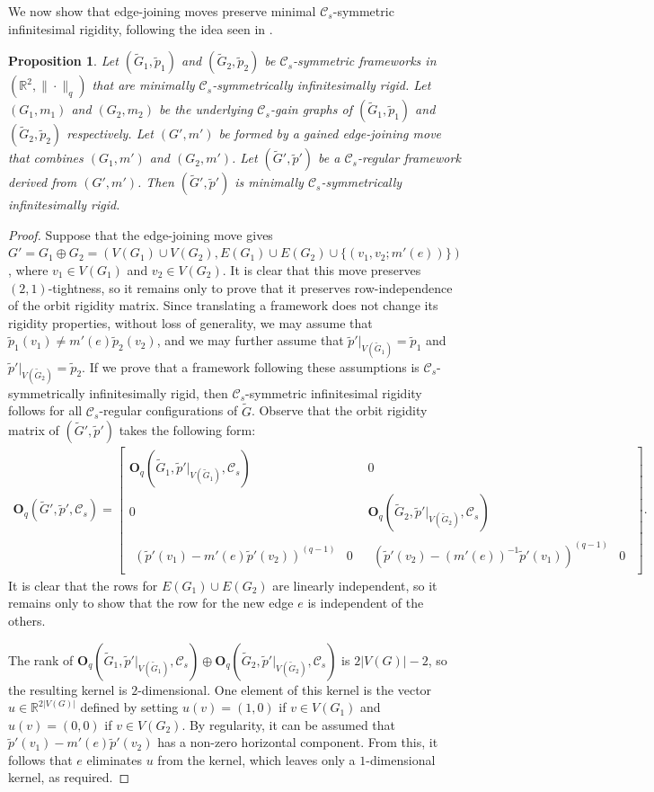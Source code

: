 \documentclass[reqno,a4paper,10pt]{article}
\newtheorem{proposition}[theorem]{Proposition}
\theoremstyle{definition}
\theoremstyle{remark}
\numberwithin{equation}{section}
\numberwithin{figure}{section}
\numberwithin{table}{section}
\newcommand{\R}{\mathbb{R}}
\newcommand{\G}{\tilde{G}}
\newcommand{\p}{\tilde{p}}
\begin{document}
    We now show that edge-joining moves preserve minimal $\mathcal{C}_s$-symmetric infinitesimal rigidity, following the idea seen in \cite[Lemma 11]{Surfaces}.
    \begin{proposition}\label{LqCsJoiningExtension}
		Let $(\G_1,\p_1)$ and $(\G_2,\p_2)$ be $\mathcal{C}_s$-symmetric frameworks in $(\R^2,\|\cdot\|_q)$ that are minimally $\mathcal{C}_s$-symmetrically infinitesimally rigid. Let $(G_1,m_1)$ and $(G_2,m_2)$ be the underlying $\mathcal{C}_s$-gain graphs of $(\G_1,\p_1)$ and $(\G_2,\p_2)$ respectively. Let $(G',m')$ be formed by a gained edge-joining move that combines $(G_1,m')$ and $(G_2,m')$. Let $(\G',\p')$ be a $\mathcal{C}_s$-regular framework derived from $(G',m')$. Then $(\G',\p')$ is minimally $\mathcal{C}_s$-symmetrically infinitesimally rigid.
	\end{proposition}
	\begin{proof}
		Suppose that the edge-joining move gives $G'= G_1\oplus G_2=(V(G_1)\cup V(G_2),E(G_1)\cup E(G_2)\cup\{(v_1,v_2;m'(e))\})$, where $v_1\in V(G_1)$ and $v_2\in V(G_2)$. It is clear that this move preserves $(2,1)$-tightness, so it remains only to prove that it preserves row-independence of the orbit rigidity matrix. Since translating a framework does not change its rigidity properties, without loss of generality, we may assume that $\tilde{p}_1(v_1)\neq m'(e)\tilde{p}_2(v_2)$, and  we may further assume that $\p'|_{V(\G_1)}=\p_1$ and $\p'|_{V(\G_2)}=\p_2$. If we prove that a framework following these assumptions is $\mathcal{C}_s$-symmetrically infinitesimally rigid, then $\mathcal{C}_s$-symmetric infinitesimal rigidity follows for all $\mathcal{C}_s$-regular configurations of $\G$. Observe that the orbit rigidity matrix of $(\G',\p')$ takes the following form:
		\begin{align*}
			\mathbf{O}_q(\G',\p',\mathcal{C}_s)=
			\begin{bmatrix}
				\mathbf{O}_q(\G_1,\p'|_{V(\G_1)},\mathcal{C}_s)&0\\
				0&\mathbf{O}_q(\G_2,\p'|_{V(\G_2)},\mathcal{C}_s)\\
				\begin{matrix}
					(\p'(v_1)-m'(e)\p'(v_2))^{(q-1)}&0
				\end{matrix}
				&
				\begin{matrix}
					(\p'(v_2)-(m'(e))^{-1}\p'(v_1))^{(q-1)}&0
				\end{matrix}
			\end{bmatrix}
			.
		\end{align*}
		It is clear that the rows for $E(G_1)\cup E(G_2)$ are linearly independent, so it remains only to show that the row for the new edge $e$ is independent of the others.

        The rank of $\mathbf{O}_q(\G_1,\p'|_{V(\G_1)},\mathcal{C}_s)\oplus\mathbf{O}_q(\G_2,\p'|_{V(\G_2)},\mathcal{C}_s)$ is $2|V(G)|-2$, so the resulting kernel is $2$-dimensional. One element of this kernel is the vector $u\in \R^{2|V(G)|}$ defined by setting $u(v)=(1,0)$ if $v\in V(G_1)$ and $u(v)=(0,0)$ if $v\in V(G_2)$. By regularity, it can be assumed that $\p'(v_1)-m'(e)\p'(v_2)$ has a non-zero horizontal component. From this, it follows that $e$ eliminates $u$ from the kernel, which leaves only a $1$-dimensional kernel, as required.
	\end{proof}
\end{document}
